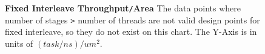 \begin{figure}
\caption{{\bf Fixed Interleave Throughput{\tt /}Area} The data points where number of stages {\tt >} number of threads are not valid design points for fixed interleave, so they do not exist on this chart. The Y-Axis is in units of $(task/ns)/um^2$.}
\label{fig:fixedThroughputPerArea}
\end{figure}



